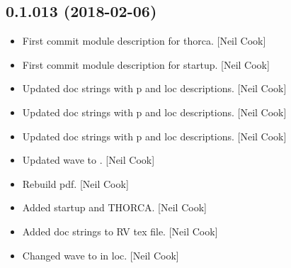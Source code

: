 \documentclass[a4paper,10pt,english]{report}
\begin{document}
\subsection{0.1.013 (2018-02-06)}
\label{\detokenize{misc/changelog:id490}}\begin{itemize}
\item {} 
First commit module description for thorca. {[}Neil Cook{]}

\item {} 
First commit module description for startup. {[}Neil Cook{]}

\item {} 
Updated doc strings with p and loc descriptions. {[}Neil Cook{]}

\item {} 
Updated doc strings with p and loc descriptions. {[}Neil Cook{]}

\item {} 
Updated doc strings with p and loc descriptions. {[}Neil Cook{]}

\item {} 
Updated wave to . {[}Neil Cook{]}

\item {} 
Rebuild pdf. {[}Neil Cook{]}

\item {} 
Added startup and THORCA. {[}Neil Cook{]}

\item {} 
Added doc strings to RV tex file. {[}Neil Cook{]}

\item {} 
Changed wave to  in loc. {[}Neil Cook{]}

\end{itemize}
\end{document}
